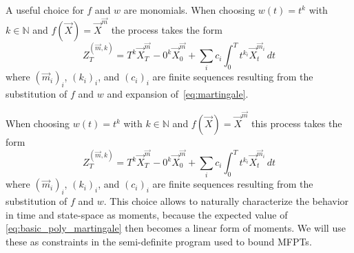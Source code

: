 A useful choice for $f$ and $w$ are monomials.
When choosing $w(t)=t^k$
with $k\in\mathbb N$ and $f(\vec X)={\vec X}^{\vec m}$
the process takes the form
\begin{equation}\label{eq:basic_poly_martingale_app}
Z_T^{(\vec m, k)}=
         T^k \vec X_T^{\vec m}
        - 0^k \vec X_{0}^{\vec m}
        + \sum_{i}c_i\int_0^T t^{k_i} \vec X_t^{\vec m_i}\,dt
\end{equation}
where   $(\vec m_i)_i$, $(k_i)_i$, and $(c_i)_i$ are finite sequences resulting
from the substitution
of $f$ and $w$
and expansion of~\eqref{eq:martingale}.


When choosing $w(t)=t^k$ with $k\in\mathbb N$ and $f(\vec X)={\vec X}^{\vec m}$
this process takes the form
\begin{equation}\label{eq:basic_poly_martingale}
Z_T^{(\vec m, k)}=
         T^k \vec X_T^{\vec m}
        - 0^k \vec X_{0}^{\vec m}
        + \sum_{i}c_i\int_0^T t^{k_i} \vec X_t^{\vec m_i}\,dt
\end{equation}
where   $(\vec m_i)_i$, $(k_i)_i$, and $(c_i)_i$ are finite sequences resulting
from the substitution
of $f$ and $w$.
 This choice allows to naturally
characterize the behavior in time and state-space as moments, because
the expected value of \eqref{eq:basic_poly_martingale} then becomes a linear form
of moments.
We will use these as constraints in the semi-definite program used to bound \acp{MFPT}.

